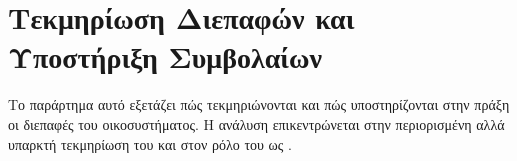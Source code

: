 \chapter{Τεκμηρίωση Διεπαφών και Υποστήριξη Συμβολαίων}
\label{app:api_documentation_contracts}

Το παράρτημα αυτό εξετάζει πώς τεκμηριώνονται και πώς υποστηρίζονται στην πράξη οι διεπαφές του οικοσυστήματος.
Η ανάλυση επικεντρώνεται στην περιορισμένη αλλά υπαρκτή  τεκμηρίωση του 
και στον ρόλο του  ως .




